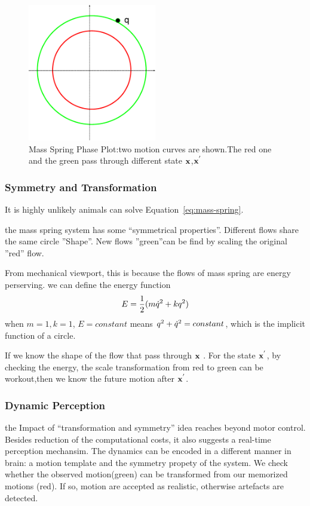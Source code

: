 \begin{figure}[!htbp]
  \begin{center}
     \includegraphics[width=0.5\textwidth]{MassSpringPhasePlot}
    \caption{Mass Spring Phase Plot:two motion curves are shown.The red one and the green pass through different state $\mathbf{x}$,$\mathbf{x}^{'}$}
    \label{fig:massSpringPhasePlot}
  \end{center}
\end{figure}

\subsubsection*{Symmetry and Transformation}
It is highly unlikely animals can solve Equation~\ref{eq:mass-spring}.

the mass spring system has some ``symmetrical properties''.
Different flows share the same circle ''Shape''.
New flows ''green''can be find by scaling the original ''red'' flow.

From mechanical viewport, this is because the flows of mass spring are energy perserving.
we can define the energy function
\[
E=\frac{1}{2}(m\dot{q}^2+kq^2)
\]
when $m=1,k=1$, $E=constant$ means $q^2+\dot{q}^2=constant$, which is the implicit function of a circle.

If we know the shape of the flow that pass through  $\mathbf{x}$ .
For the state $\mathbf{x}^{'}$, by checking the energy, the scale transformation from red to green can be workout,then we know the future motion after $\mathbf{x}^{'}$.


\subsubsection*{Dynamic Perception}
the Impact of ``transformation and symmetry'' idea reaches beyond motor control. 
Besides reduction of the computational costs, it also suggests a real-time perception mechansim.
The dynamics can be encoded in a different manner in brain: a motion template and the symmetry propety of the system.
We check whether the observed motion(green) can be transformed from our memorized motions (red).
If so, motion are accepted as realistic, otherwise artefacts are detected.


